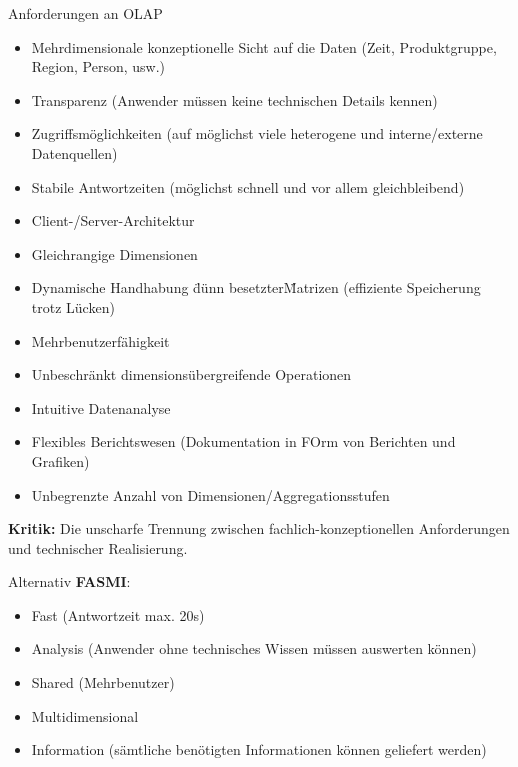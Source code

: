 \documentclass[a6paper,10pt,grid=front%
,toc
]{kartei}
\begin{document}
  \begin{karte}{Anforderungen an OLAP}  
        
    \begin{itemize}
      \item Mehrdimensionale konzeptionelle Sicht auf die Daten (Zeit, Produktgruppe, Region, Person, usw.)
      \item Transparenz (Anwender müssen keine technischen Details kennen)
      \item Zugriffsmöglichkeiten (auf möglichst viele heterogene und interne/externe Datenquellen)
      \item Stabile Antwortzeiten (möglichst schnell und vor allem gleichbleibend)
      \item Client-/Server-Architektur
      \item Gleichrangige Dimensionen
      \item Dynamische Handhabung \"dünn besetzter\" Matrizen (effiziente Speicherung trotz Lücken)
      \item Mehrbenutzerfähigkeit
      \item Unbeschränkt dimensionsübergreifende Operationen
      \item Intuitive Datenanalyse
      \item Flexibles Berichtswesen (Dokumentation in FOrm von Berichten und Grafiken)
      \item Unbegrenzte Anzahl von Dimensionen/Aggregationsstufen
    \end{itemize}

    \textbf{Kritik:} Die unscharfe Trennung zwischen fachlich-konzeptionellen Anforderungen und technischer Realisierung.

    Alternativ \textbf{FASMI}:

    \begin{itemize}
      \item Fast (Antwortzeit max. 20s)
      \item Analysis (Anwender ohne technisches Wissen müssen auswerten können)
      \item Shared (Mehrbenutzer)
      \item Multidimensional
      \item Information (sämtliche benötigten Informationen können geliefert werden)      
    \end{itemize}
  \end{karte}
\end{document}
